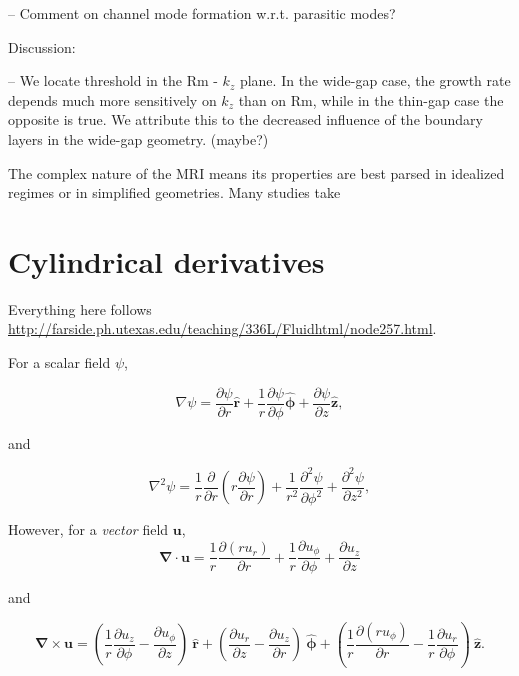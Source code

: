 \documentclass{paper}
\newcommand{\uphi}{\ensuremath{u_\phi}}
\newcommand{\rhat}{\ensuremath{\mathbf{\hat{r}}}}
\newcommand{\phihat}{\ensuremath{\mathbf{\hat{\phi}}}}
\newcommand{\zhat}{\ensuremath{\mathbf{\hat{z}}}}
\newcommand\reym{\mathrm{Rm}}
\begin{document}
-- Comment on channel mode formation w.r.t. parasitic modes?

Discussion:

-- We locate threshold in the $\reym$ - $k_z$ plane. In the wide-gap case, the growth rate depends much more sensitively on $k_z$ than on $\reym$, while in the thin-gap case the opposite is true. We attribute this to the decreased influence of the boundary layers in the wide-gap geometry. (maybe?)

The complex nature of the MRI means its properties are best parsed in idealized regimes or in simplified geometries. Many studies take 


\appendix

\section{Cylindrical derivatives}
\label{sec:cylindrical_deriv}

Everything here follows \url{http://farside.ph.utexas.edu/teaching/336L/Fluidhtml/node257.html}.

For a scalar field $\psi$, 

\begin{equation}
  \label{eq:del_scalar}
  \nabla \psi = \frac{\partial \psi}{\partial r} \rhat + \frac{1}{r} \frac{\partial \psi}{\partial \phi} \phihat + \frac{\partial \psi}{\partial z} \zhat,
\end{equation}

and

\begin{equation}
  \label{eq:del2_scalar}
  \nabla^2 \psi = \frac{1}{r} \frac{\partial}{\partial r}\left(r \frac{\partial \psi}{\partial r} \right) + \frac{1}{r^2} \frac{\partial^2 \psi}{\partial \phi^2} + \frac{\partial^2 \psi}{\partial z^2},
\end{equation}

However, for a \emph{vector} field $\mathbf{u}$,
\begin{equation}
  \label{eq:div}
  \mathbf{\nabla \cdot u} = \frac{1}{r} \frac{\partial (r u_r)}{\partial r} + \frac{1}{r} \frac{\partial \uphi}{\partial \phi}  + \frac{\partial u_z}{\partial z}
\end{equation}

and 

\begin{equation}
  \label{eq:curl}
  \mathbf{\nabla \times u} = \left( \frac{1}{r} \frac{\partial u_z}{\partial \phi} - \frac{\partial u_\phi}{\partial z}\right)\ \rhat + \left(\frac{\partial u_r}{\partial z} - \frac{\partial u_z}{\partial r}\right)\ \phihat  + \left( \frac{1}{r} \frac{\partial (r \uphi)}{\partial r} - \frac{1}{r}\frac{\partial u_r}{\partial \phi}\right)\ \zhat.
\end{equation}
\end{document}
